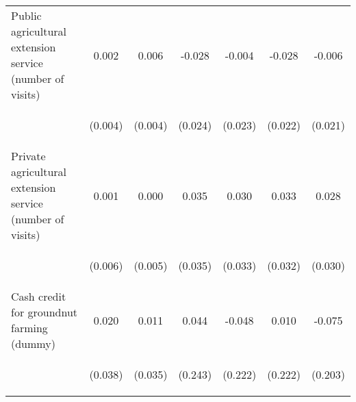 \begin{center}
\begin{tabular}{lcccccc}
Public agricultural extension service (number of visits) & 0.002 & 0.006 & -0.028 & -0.004 & -0.028 & -0.006 \\
\vspace{4pt} & \begin{footnotesize}(0.004)\end{footnotesize} & \begin{footnotesize}(0.004)\end{footnotesize} & \begin{footnotesize}(0.024)\end{footnotesize} & \begin{footnotesize}(0.023)\end{footnotesize} & \begin{footnotesize}(0.022)\end{footnotesize} & \begin{footnotesize}(0.021)\end{footnotesize} \\
Private agricultural extension service (number of visits) & 0.001 & 0.000 & 0.035 & 0.030 & 0.033 & 0.028 \\
\vspace{4pt} & \begin{footnotesize}(0.006)\end{footnotesize} & \begin{footnotesize}(0.005)\end{footnotesize} & \begin{footnotesize}(0.035)\end{footnotesize} & \begin{footnotesize}(0.033)\end{footnotesize} & \begin{footnotesize}(0.032)\end{footnotesize} & \begin{footnotesize}(0.030)\end{footnotesize} \\
Cash credit for groundnut farming (dummy) & 0.020 & 0.011 & 0.044 & -0.048 & 0.010 & -0.075 \\
\vspace{4pt} & \begin{footnotesize}(0.038)\end{footnotesize} & \begin{footnotesize}(0.035)\end{footnotesize} & \begin{footnotesize}(0.243)\end{footnotesize} & \begin{footnotesize}(0.222)\end{footnotesize} & \begin{footnotesize}(0.222)\end{footnotesize} & \begin{footnotesize}(0.203)\end{footnotesize} \\

\end{tabular}
\end{center}
